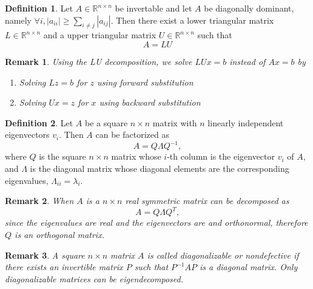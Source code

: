 \documentclass[a4paper]{article}
\theoremstyle{definition}
\newtheorem{definition}{Definition}
\theoremstyle{plain}
\newtheorem{remark}{Remark}
\begin{document}
\begin{definition}
 Let $A\in\mathbb{R}^{n\times n}$ be invertable and let $A$ be diagonally dominant, namely $\forall i, |a_{ii}|\ge\sum_{i\not=j}|a_{ij}|$. Then there exist a lower triangular matrix $L\in\mathbb{R}^{n\times n}$ and a upper triangular matrix $U\in\mathbb{R}^{n\times n}$ such that
\begin{equation*}
    A=LU
\end{equation*}
\end{definition}

\begin{remark}
Using the LU decomposition, we solve $LUx=b$ instead of $Ax=b$ by
\begin{enumerate}
    \item Solving $Lz=b$ for $z$ using forward substitution
    \item Solving $Ux=z$ for $x$ using backward substitution
\end{enumerate}
\end{remark}

\begin{definition}
Let $A$ be a square $n\times n$ matrix with $n$ linearly independent eigenvectors $v_i$. Then $A$ can be factorized as
\begin{equation*}
    A=Q\Lambda Q^{-1},
\end{equation*}
where $Q$ is the square $n\times n$ matrix whose $i$-th column is the eigenvector $v_i$ of $A$, and $\Lambda$ is the diagonal matrix whose diagonal elements are the corresponding eigenvalues, $\Lambda_{ii}= \lambda_i$. 
\end{definition}

\begin{remark}
When $A$ is a $n\times n$ real symmetric matrix can be decomposed as
\begin{equation*}
    A=Q\Lambda Q^T,
\end{equation*}
since the eigenvalues are real and the eigenvectors are and orthonormal, therefore $Q$ is an orthogonal matrix.
\end{remark}

\begin{remark}
A square $n\times n$ matrix $A$ is called diagonalizable or nondefective if there exists an invertible matrix $P$ such that $P^{-1}AP$ is a diagonal matrix. Only diagonalizable matrices can be eigendecomposed. 
\end{remark}
\end{document}
